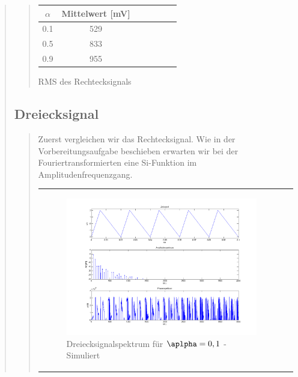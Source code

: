 \begin{quote}
\begin{quote}
            \hspace{-4em}
                  \begin{tabular}{|c|c|c|c|c|c|c|}
                  \hline
                   $\alpha $ &  Mittelwert [mV] \\ \hline 
                   0.1 &  529 \\ \hline
                   0.5 &  833 \\ \hline
                   0.9 &  955 \\ \hline           
                 \end{tabular}
                       \caption{RMS des Rechtecksignals}
                        \label{tablelabel1}
        
    \end{quote}
    
    \subsection{Dreiecksignal}
    \begin{quote}
        Zuerst vergleichen wir das Rechtecksignal. Wie in der Vorbereitungsaufgabe beschieben erwarten wir bei der
        Fouriertransformierten eine Si-Funktion im Amplitudenfrequenzgang.

            \begin{center}
            \begin{tabular}{ll}
            
            \hspace{-12em}
                \begin{minipage}{0.6\textwidth}
                    
                    \begin{figure}[H]
                        \label{fig:}            
                        \includegraphics[scale=0.25]{./Bilder/drei_alpha1.png} %
                        \caption{Dreiecksignalspektrum für $\aplpha = 0,1$ - Simuliert}
                    \end{figure}
                    

\end{minipage}
\end{tabular}
\end{center}
\end{quote}
\end{quote}
